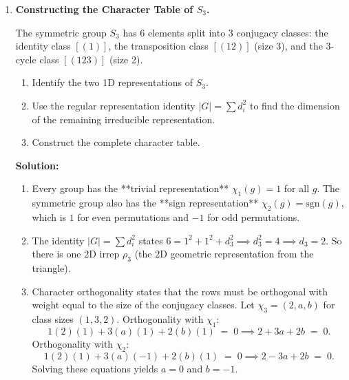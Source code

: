 \documentclass[12pt, a4paper]{article}
\begin{document}
\begin{enumerate}[label=\textbf{S\arabic*.}]
  \item \textbf{Constructing the Character Table of $S_3$.}
  
        The symmetric group $S_3$ has 6 elements split into 3 conjugacy classes: the identity class $[(1)]$, the transposition class $[(12)]$ (size 3), and the 3-cycle class $[(123)]$ (size 2).
        \begin{enumerate}
          \item Identify the two 1D representations of $S_3$.
          \item Use the regular representation identity $|G| = \sum d_i^2$ to find the dimension of the remaining irreducible representation.
          \item Construct the complete character table.
        \end{enumerate}
        
        \textbf{Solution:}
        \begin{enumerate}
          \item Every group has the **trivial representation** $\chi_1(g) = 1$ for all $g$.
                The symmetric group also has the **sign representation** $\chi_2(g) = \text{sgn}(g)$, which is $1$ for even permutations and $-1$ for odd permutations.
          \item The identity $|G| = \sum d_i^2$ states $6 = 1^2 + 1^2 + d_3^2 \implies d_3^2 = 4 \implies d_3 = 2$.
                So there is one 2D irrep $\rho_3$ (the 2D geometric representation from the triangle).
          \item Character orthogonality states that the rows must be orthogonal with weight equal to the size of the conjugacy classes.
                Let $\chi_3 = (2, a, b)$ for class sizes $(1, 3, 2)$.
                Orthogonality with $\chi_1$:
                \[
                  1(2)(1) + 3(a)(1) + 2(b)(1) \;=\; 0 \implies 2 + 3a + 2b \;=\; 0.
                \]
                Orthogonality with $\chi_2$:
                \[
                  1(2)(1) + 3(a)(-1) + 2(b)(1) \;=\; 0 \implies 2 - 3a + 2b \;=\; 0.
                \]
                Solving these equations yields $a = 0$ and $b = -1$.
                

\end{enumerate}
\end{enumerate}
\end{document}
